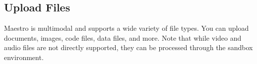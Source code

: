 \subsection*{Upload Files}

Maestro is multimodal and supports a wide variety of file types. You can upload documents, images, code files, data files, and more. Note that while video and audio files are not directly supported, they can be processed through the sandbox environment.